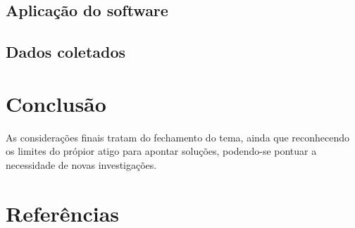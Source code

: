 \documentclass[12pt]{article}
\begin{document}
{	\subsection{Aplicação do software}
	\subsection{Dados coletados}
	
	
	\section{Conclusão}
		As considerações finais tratam do fechamento do tema, ainda que reconhecendo os limites do própior atigo para apontar soluções, podendo-se pontuar a necessidade de novas investigações.
	} 
	
	
		\section{Referências} 
	
	
	
\end{document}
